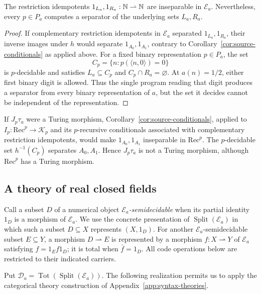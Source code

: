 \begin{corollary}\label{cor:miller-cuts-inseparable}
The restriction idempotents $1_{L_a},1_{R_a}:\mathbb N\rightharpoonup\mathbb N$ are inseparable in
$\mathcal E_a$. Nevertheless, every $p\in P_a$ computes a separator
of the underlying sets $L_a,R_a$.
\end{corollary}
\begin{proof}
If complementary restriction idempotents in $\mathcal E_a$ separated
$1_{L_a},1_{R_a}$, their inverse images under $h$ would separate
$1_{A_0},1_{A_1}$, contrary to
Corollary~\ref{cor:source-conditionals} as applied above.
For a fixed binary representation $p\in P_a$, the set
\[
 C_p=\{n:p(\langle n,0\rangle)=0\}
\]
is $p$-decidable and satisfies $L_a\subseteq C_p$ and
$C_p\cap R_a=\varnothing$. At $a(n)=1/2$, either first binary digit
is allowed. Thus the single program reading that digit produces a
separator from every binary representation of $a$, but the set it decides
cannot be independent of the representation.
\end{proof}

If $J_p\tau_a$ were a Turing morphism, Corollary~\ref{cor:source-conditionals},
applied to $I_p:\mathrm{Rec}^{p}\to\mathcal K_p$ and its
$p$-recursive conditionals associated with complementary restriction
idempotents, would make $1_{A_0},1_{A_1}$ inseparable in
$\mathrm{Rec}^{p}$. The $p$-decidable set $h^{-1}(C_p)$ separates
$A_0,A_1$. Hence $J_p\tau_a$ is not a Turing
morphism, although $\mathrm{Rec}^{p}$ has a Turing morphism.


\subsection{A theory of real closed fields}
\label{def:miller-splitting}

Call a subset $D$ of a numerical object \emph{$\mathcal E_a$-semidecidable}
when its partial identity $1_D$ is a morphism of $\mathcal E_a$.
We use the concrete presentation of $\operatorname{Split}(\mathcal E_a)$
in which such a subset $D\subseteq X$ represents $(X,1_D)$.
For another $\mathcal E_a$-semidecidable subset $E\subseteq Y$,
a morphism $D\rightharpoonup E$ is represented by
a morphism $f:X\rightharpoonup Y$ of $\mathcal E_a$ satisfying
$f=1_Ef1_D$; it is total when $\bar f=1_D$.
All code operations below are restricted to their indicated carriers.

Put $\mathcal D_a=\operatorname{Tot}(\operatorname{Split}(\mathcal E_a))$.
The following realization permits us to apply the categorical theory
construction of Appendix~\ref{app:syntax-theories}.

